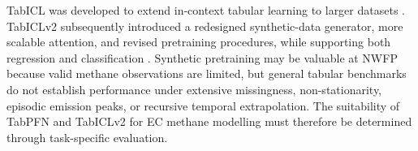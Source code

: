 TabICL was developed to extend in-context tabular learning to larger datasets
\cite{qu2025tabicl}. TabICLv2 subsequently introduced a redesigned
synthetic-data generator, more scalable attention, and revised pretraining
procedures, while supporting both regression and classification
\cite{qu2026tabiclv2}. Synthetic pretraining may be valuable at NWFP because
valid methane observations are limited, but general tabular benchmarks do not
establish performance under extensive missingness, non-stationarity, episodic
emission peaks, or recursive temporal extrapolation. The suitability of TabPFN
and TabICLv2 for EC methane modelling must therefore be determined through
task-specific evaluation.




